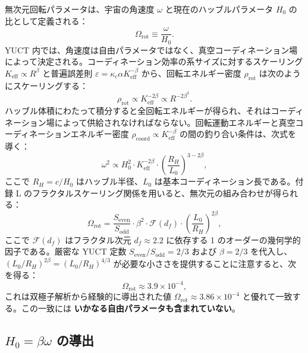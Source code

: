 \documentclass[11pt,a4paper]{article}
\begin{document}
	無次元回転パラメータは、宇宙の角速度 \(\omega\) と現在のハッブルパラメータ \(H_0\) の比として定義される：
	\begin{equation}
		\Omega_{\mathrm{rot}} \equiv \frac{\omega}{H_0}.
	\end{equation}
	YUCT 内では、角速度は自由パラメータではなく、真空コーディネーション場によって決定される。コーディネーション効率の系サイズに対するスケーリング \(K_{\mathrm{eff}} \propto R^{\beta}\) と普遍誤差則 \(\varepsilon = \kappa_c \alpha K_{\mathrm{eff}}^{-\beta}\) から、回転エネルギー密度 \(\rho_{\mathrm{rot}}\) は次のようにスケーリングする：
	\begin{equation}
		\rho_{\mathrm{rot}} \propto K_{\mathrm{eff}}^{-2\beta} \propto R^{-2\beta^2}.
	\end{equation}
	ハッブル体積にわたって積分すると全回転エネルギーが得られ、それはコーディネーション場によって供給されなければならない。回転運動エネルギーと真空コーディネーションエネルギー密度 \(\rho_{\mathrm{coord}} \propto K_{\mathrm{eff}}^{-\beta}\) の間の釣り合い条件は、次式を導く：
	\begin{equation}
		\omega^2 \propto H_0^2 \cdot K_{\mathrm{eff}}^{-2\beta} \cdot \left(\frac{R_H}{L_0}\right)^{3-2\beta},
	\end{equation}
	ここで \(R_H = c/H_0\) はハッブル半径、\(L_0\) は基本コーディネーション長である。付録 L のフラクタルスケーリング関係を用いると、無次元の組み合わせが得られる：
	\begin{equation}
		\Omega_{\mathrm{rot}} = \frac{S_{\mathrm{even}}}{S_{\mathrm{odd}}} \cdot \beta^2 \cdot \mathcal{F}(d_f) \cdot \left(\frac{L_0}{R_H}\right)^{2\beta},
	\end{equation}
	ここで \(\mathcal{F}(d_f)\) はフラクタル次元 \(d_f \approx 2.2\) に依存する 1 のオーダーの幾何学的因子である。厳密な YUCT 定数 \(S_{\mathrm{even}}/S_{\mathrm{odd}} = 2/3\) および \(\beta = 2/3\) を代入し、\((L_0/R_H)^{2\beta} = (L_0/R_H)^{4/3}\) が必要な小ささを提供することに注意すると、次を得る：
	\begin{equation}
		\boxed{\Omega_{\mathrm{rot}} \approx 3.9 \times 10^{-4}},
	\end{equation}
	これは双極子解析から経験的に導出された値 \(\Omega_{\mathrm{rot}} \approx 3.86 \times 10^{-4}\) と優れて一致する。この一致には \textbf{いかなる自由パラメータも含まれていない}。
	
	\subsection{\(H_0 = \beta \omega\) の導出}
	
\end{document}
